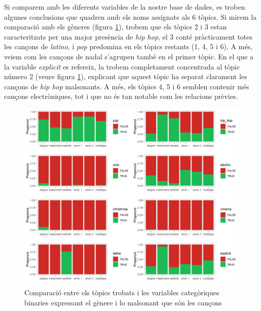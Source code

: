 Si comparem amb les diferents variables de la nostre base de dades, es troben algunes conclusions que quadren amb els noms assignats als 6 tòpics. Si mirem la comparació amb els gèneres (figura \ref{fig:LDA:genre_profiling}), trobem que els tòpics 2 i 3 estan caracteritzats per una major presència de \textit{hip hop}, el 3 conté pràcticament totes les cançons de \textit{latino}, i \textit{pop} predomina en els tòpics restants (1, 4, 5 i 6). A més, veiem com les cançons de nadal s'agrupen també en el primer tòpic. En el que a la variable \textit{explicit} es refereix, la trobem completament concentrada al tòpic número 2 (veure figura \ref{fig:LDA:genre_profiling}), explicant que aquest tòpic ha separat clarament les cançons de \textit{hip hop} malsonants. A més, els tòpics 4, 5 i 6 semblen contenir més cançons electròniques, tot i que no és tan notable com les relacions prèvies.

\begin{figure}[H]
    \centering
    \includegraphics[width=0.95\linewidth]{Images/8_Textual/LDA/profiling_genres.png}
    \caption{Comparació entre els tòpics trobats i les variables categòriques binaries expressant el gènere i lo malsonant que són les cançons}
    \label{fig:LDA:genre_profiling}
\end{figure}

